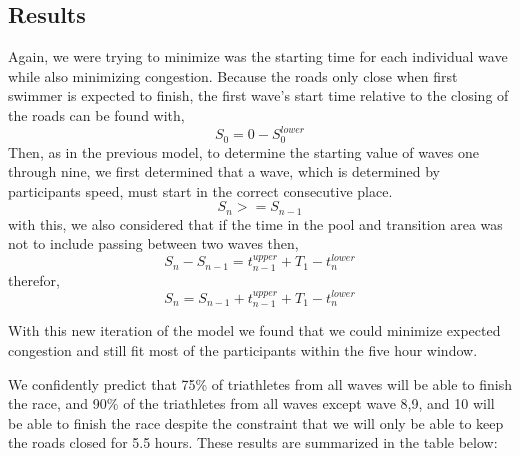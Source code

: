 \documentclass[12pt]{article}
\begin{document}
\subsection{Results}
Again, we were trying to minimize was the starting time for each individual wave while also minimizing congestion. Because the roads only close when first swimmer is expected to finish, the first wave's start time relative to the closing of the roads can be found with,
\[S_0 = 0 - S_0^{lower}\]
Then, as in the previous model, to determine the starting value of waves one through nine, we first determined that a wave, which is determined by participants speed, must start in the correct consecutive place.
\[S_{n} >= S_{n-1}\]
with this, we also considered that if the time in the pool and transition area was not to include passing between two waves then,
\[S_n - S_{n-1} = t_{n-1}^{upper} + T_1 - t_n^{lower}\]
therefor,
\[S_n = S_{n-1} + t_{n-1}^{upper} + T_1 - t_n^{lower}\]

With this new iteration of the model we found that we could minimize expected congestion and still fit most of the participants within the five hour window.

We confidently predict that 75\% of triathletes from all waves will be able to finish the race, and 90\% of the triathletes from all waves except wave 8,9, and 10 will be able to finish the race despite the constraint that we will only be able to keep the roads closed for 5.5 hours. These results are summarized in the table below:
\end{document}
